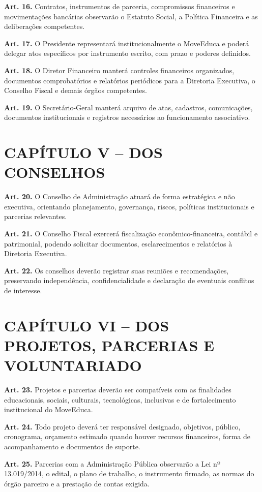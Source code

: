 \documentclass[11pt,a4paper]{article}
\begin{document}
\textbf{Art. 16.} Contratos, instrumentos de parceria, compromissos financeiros e movimentações bancárias observarão o Estatuto Social, a Política Financeira e as deliberações competentes.

\textbf{Art. 17.} O Presidente representará institucionalmente o MoveEduca e poderá delegar atos específicos por instrumento escrito, com prazo e poderes definidos.

\textbf{Art. 18.} O Diretor Financeiro manterá controles financeiros organizados, documentos comprobatórios e relatórios periódicos para a Diretoria Executiva, o Conselho Fiscal e demais órgãos competentes.

\textbf{Art. 19.} O Secretário-Geral manterá arquivo de atas, cadastros, comunicações, documentos institucionais e registros necessários ao funcionamento associativo.

\section*{CAPÍTULO V -- DOS CONSELHOS}

\textbf{Art. 20.} O Conselho de Administração atuará de forma estratégica e não executiva, orientando planejamento, governança, riscos, políticas institucionais e parcerias relevantes.

\textbf{Art. 21.} O Conselho Fiscal exercerá fiscalização econômico-financeira, contábil e patrimonial, podendo solicitar documentos, esclarecimentos e relatórios à Diretoria Executiva.

\textbf{Art. 22.} Os conselhos deverão registrar suas reuniões e recomendações, preservando independência, confidencialidade e declaração de eventuais conflitos de interesse.

\section*{CAPÍTULO VI -- DOS PROJETOS, PARCERIAS E VOLUNTARIADO}

\textbf{Art. 23.} Projetos e parcerias deverão ser compatíveis com as finalidades educacionais, sociais, culturais, tecnológicas, inclusivas e de fortalecimento institucional do MoveEduca.

\textbf{Art. 24.} Todo projeto deverá ter responsável designado, objetivos, público, cronograma, orçamento estimado quando houver recursos financeiros, forma de acompanhamento e documentos de suporte.

\textbf{Art. 25.} Parcerias com a Administração Pública observarão a Lei nº 13.019/2014, o edital, o plano de trabalho, o instrumento firmado, as normas do órgão parceiro e a prestação de contas exigida.
\end{document}
